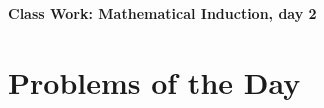 \documentclass[11pt]{article}
\begin{document}
	
	\thispagestyle{empty}
	\renewcommand{\headrulewidth}{0.0pt}
	\thispagestyle{fancy}
	\lfoot{}
	\cfoot{}
	\rfoot{}	
	
	\vspace*{0in}

		\begin{center}
			\begin{large}
			\textbf{Class Work: Mathematical Induction, day 2} \\
			\end{large}
			
		\end{center}
		

\section*{Problems of the Day}
\end{document}
